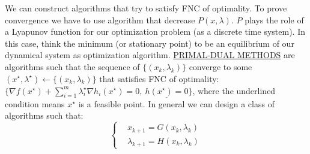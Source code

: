 We can construct algorithms that try to satisfy FNC of optimality. To prove convergence we have to use algorithm that decrease $P(x,\lambda)$. $P$ plays the role of a Lyapunov function for our optimization problem (as a discrete time system). In this case, think the minimum (or stationary point) to be an equilibrium of our dynamical system as optimization algorithm. \newline\underline{PRIMAL-DUAL METHODS} are algorithms such that the sequence of $\{(x_k,\lambda_k)\}$ converge to some $(x^\star,\lambda^\star) \leftarrow \{(x_k,\lambda_k)\}$ that satisfies FNC of optimality: $\{\nabla{f(x^\star)} + \sum_{i=1}^m{\lambda_i^\star\nabla{h_i(x^\star)}} = 0,\ \underline{h(x^\star) = 0}\}$, where the underlined condition means $x^\star$ is a feasible point. In general we can design a class of algorithms such that:
\[
	\left\{
	\begin{aligned}
	&x_{k+1} = G(x_k,\lambda_k)\\
	&\lambda_{k+1} = H(x_k,\lambda_k)
	\end{aligned}
	\right.
\]

